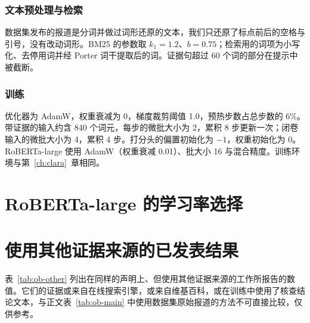 \subsubsection{文本预处理与检索}
数据集发布的报道是分词并做过词形还原的文本，我们只还原了标点前后的空格与引号，没有改动词形。BM25 的参数取 $k_1=1.2$、$b=0.75$；检索用的词项为小写化、去停用词并经 Porter 词干提取后的词。证据句超过 60 个词的部分在提示中被截断。

\subsubsection{训练}
优化器为 AdamW，权重衰减为 0，梯度裁剪阈值 1.0，预热步数占总步数的 6\%。带证据的输入约含 840 个词元，每步的微批大小为 2，累积 8 步更新一次；闭卷输入的微批大小为 4，累积 4 步。打分头的偏置初始化为 $-1$，权重初始化为 0。RoBERTa-large 使用 AdamW（权重衰减 0.01）、批大小 16 与混合精度。训练环境与第~\ref{ch:clara}~章相同。

\section{RoBERTa-large 的学习率选择}

\begin{table}[htbp]
\centering\small
\caption{RoBERTa-large 在两个学习率下的验证集与测试集 macro-F1（\%）}\label{tab:ob-slm-grid}
\end{table}

\section{使用其他证据来源的已发表结果}

表~\ref{tab:ob-other} 列出在同样的声明上、但使用其他证据来源的工作所报告的数值。它们的证据或来自在线搜索引擎，或来自维基百科，或在训练中使用了核查结论文本，与正文表~\ref{tab:ob-main} 中使用数据集原始报道的方法不可直接比较，仅供参考。

\begin{table}[htbp]
\centering\small
\caption{使用其他证据来源的工作在两个数据集的声明上报告的 F1（\%）}\label{tab:ob-other}
\end{table}
